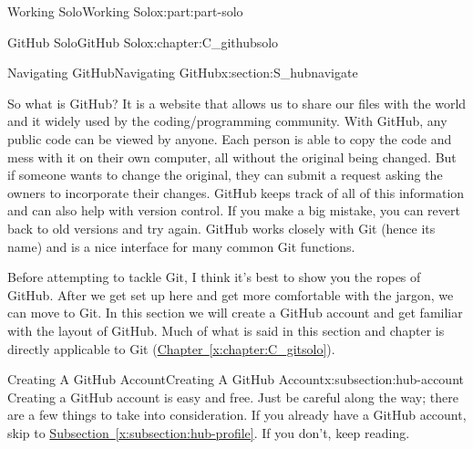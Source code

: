 \documentclass[oneside,10pt,]{book}
\newcommand{\xreffont}{\relax}
\begin{document}
\typeout{************************************************}
%
\begin{partptx}{Working Solo}{}{Working Solo}{}{}{x:part:part-solo}
%
\typeout{************************************************}
\typeout{************************************************}
%
\begin{chapterptx}{GitHub Solo}{}{GitHub Solo}{}{}{x:chapter:C_githubsolo}
%
%
\typeout{************************************************}
\typeout{************************************************}
%
\begin{sectionptx}{Navigating GitHub}{}{Navigating GitHub}{}{}{x:section:S_hubnavigate}
%
%
\begin{introduction}{}%
So what is GitHub? It is a website that allows us to share our files with the world and it widely used by the coding\slash{}programming community. With GitHub, any public code can be viewed by anyone. Each person is able to copy the code and mess with it on their own computer, all without the original being changed. But if someone wants to change the original, they can submit a request asking the owners to incorporate their changes. GitHub keeps track of all of this information and can also help with version control. If you make a big mistake, you can revert back to old versions and try again. GitHub works closely with Git (hence its name) and is a nice interface for many common Git functions.%
\par
Before attempting to tackle Git, I think it's best to show you the ropes of GitHub. After we get set up here and get more comfortable with the jargon, we can move to Git. In this section we will create a GitHub account and get familiar with the layout of GitHub. Much of what is said in this section and chapter is directly applicable to Git (\hyperref[x:chapter:C_gitsolo]{Chapter~{\xreffont\ref{x:chapter:C_gitsolo}}}).%
\end{introduction}%
%
%
\typeout{************************************************}
\typeout{************************************************}
%
\begin{subsectionptx}{Creating A GitHub Account}{}{Creating A GitHub Account}{}{}{x:subsection:hub-account}
%
%
Creating a GitHub account is easy and free. Just be careful along the way; there are a few things to take into consideration. If you already have a GitHub account, skip to \hyperref[x:subsection:hub-profile]{Subsection~{\xreffont\ref{x:subsection:hub-profile}}}. If you don't, keep reading.%

\end{subsectionptx}
\end{sectionptx}
\end{chapterptx}
\end{partptx}
\end{document}
